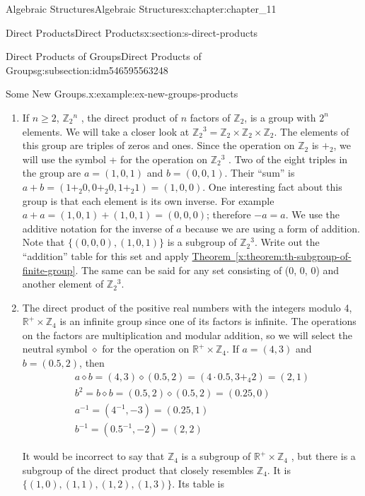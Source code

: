 \documentclass[oneside,10pt,]{book}
\newcommand{\xreffont}{\relax}
\numberwithin{equation}{section}
\begin{document}
\begin{chapterptx}{Algebraic Structures}{}{Algebraic Structures}{}{}{x:chapter:chapter_11}
\begin{sectionptx}{Direct Products}{}{Direct Products}{}{}{x:section:s-direct-products}
\begin{subsectionptx}{Direct Products of Groups}{}{Direct Products of Groups}{}{}{g:subsection:idm546595563248}
\begin{example}{Some New Groups.}{x:example:ex-new-groups-products}
\begin{enumerate}[label=(\alph*)]
\item{}If \(n \geq  2\), \(\mathbb{Z}_2{}^n\) , the direct product of \(n\) factors of \(\mathbb{Z}_2\), is a group with \(2^n\) elements. We will take a closer look at \(\mathbb{Z}_2{}^3 = \mathbb{Z}_2 \times  \mathbb{Z}_2 \times  \mathbb{Z}_2\). The elements of this group are triples of zeros and ones. Since the operation on \(\mathbb{Z}_2\) is \(+_2\), we will use the symbol + for the operation on \(\mathbb{Z}_2{}^3\) . Two of the eight triples in the group are \(a = (1, 0, 1)\) and \(b = (0, 0, 1)\). Their ``sum'' is \(a + b = \left(1 +_2 0, 0 +_2 0, 1 +_2 1\right)
= (1, 0, 0)\). One interesting fact about this group is that each element is its own inverse. For example \(a + a = (1, 0, 1) + (1, 0, 1) = (0, 0,
0)\); therefore \(-a = a\). We use the additive notation for the inverse of \(a\) because we are using a form of addition. Note that \(\{(0, 0, 0), (1,
0, 1)\}\) is a subgroup of \(\mathbb{Z}_2{}^3\). Write out the ``addition'' table for this set and apply \hyperref[x:theorem:th-subgroup-of-finite-group]{Theorem~{\xreffont\ref{x:theorem:th-subgroup-of-finite-group}}}. The same can be said for any set consisting of (0, 0, 0) and another element of \(\mathbb{Z}_2{}^3\).%
\item{}The direct product of the positive real numbers with the integers modulo 4, \(\mathbb{R}^+ \times  \mathbb{Z}_4\) is an infinite group since one of its factors is infinite. The operations on the factors are multiplication and modular addition, so we will select the neutral symbol \(\diamond\) for the operation on \(\mathbb{R}^+ \times  \mathbb{Z}_4\). If \(a = (4, 3)\) and \(b = (0.5, 2)\), then%
\begin{equation*}
\begin{array}{c}
a \diamond  b = (4, 3) \diamond  (0.5, 2) = \left(4 \cdot  0.5, 3 +_4 2\right) = (2, 1)\\
b^2 = b \diamond  b = (0.5, 2) \diamond  (0.5, 2) = (0.25, 0)\\
a^{-1} = \left(4^{-1} , -3\right) = (0.25, 1)\\
b^{-1} = \left(0.5^{-1} , -2\right) = (2, 2)
\end{array}
\end{equation*}
%
\par
It would be incorrect to say that \(\mathbb{Z}_4\) is a subgroup of \(\mathbb{R}^+\times  \mathbb{Z}_4\) , but there is a subgroup of the direct product that closely resembles \(\mathbb{Z}_4\). It is \(\{(1, 0), (1, 1), (1, 2), (1, 3)\}\). Its table is%
\begin{equation*}

\end{equation*}
\end{enumerate}
\end{example}
\end{subsectionptx}
\end{sectionptx}
\end{chapterptx}
\end{document}
